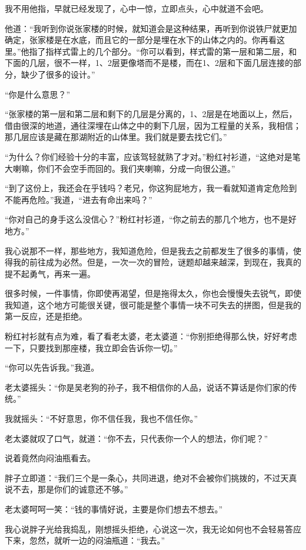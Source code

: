 我不用他指，早就已经发现了，心中一惊，立即点头，心中就道不会吧。

他道：“我听到你说张家楼的时候，就知道会是这种结果，再听到你说铁尸就更加确定，张家楼是在水底，而且它的一部分是埋在水下的山体之内的。你再看这里。”他指了指样式雷上的几个部分。“你可以看到，样式雷的第一层和第二层，和下面的几层，很不一样，1、2层更像塔而不是楼，而在1、2层和下面几层连接的部分，缺少了很多的设计。”

“你是什么意思？”

“张家楼的第一层和第二层和剩下的几层是分离的，1、2层是在地面以上，然后，借由很深的地道，通往深埋在山体之中的剩下几层，因为工程量的关系，我相信；那几层应该是藏在那湖附近的山体里。我们就是要去找它们。”

“为什么？你们经验十分的丰富，应该驾轻就熟了才对。”粉红衬衫道，“这绝对是笔大喇嘛，你们不会空手而回的。我们夹喇嘛，分成一向很公道。”

“到了这份上，我还会在乎钱吗？老兄，你这狗屁地方，我一看就知道肯定危险到不能再危险。”我道，“进去有命出来吗？”

“你对自己的身手这么没信心？”粉红衬衫道，“你之前去的那几个地方，也不是好地方。”

我心说那不一样，那些地方，我知道危险，但是我去之前都发生了很多的事情，使得我的前往成为必然。但是，一次一次的冒险，谜题却越来越深，到现在，我真的提不起勇气，再来一遍。

很多时候，一件事情，你即使再渴望，但是拖得太久，你也会慢慢失去锐气，即使我知道，这个地方可能很关键，很可能是整个事情一块不可失去的拼图，但是我的第一反应，还是拒绝。

粉红衬衫就有点为难，看了看老太婆，老太婆道：“你别拒绝得那么快，好好考虑一下，只要找到那座楼，我立即会告诉你一切。”

“你可以先告诉我。”我道。

老太婆摇头：“你是吴老狗的孙子，我不相信你的人品，说话不算话是你们家的传统。”

我就摇头：“不好意思，你不信任我，我也不信任你。”

老太婆就叹了口气，就道：“你不去，只代表你一个人的想法，你们呢？”

说着竟然向闷油瓶看去。

胖子立即道：“我们三个是一条心，共同进退，绝对不会被你们挑拨的，不过天真说不去，那是你们的诚意还不够。”

老太婆呵呵一笑：“钱的事情好说，主要是你们想去不想去。”

我心说胖子光给我捣乱，刚想摇头拒绝，心说这一次，我无论如何也不会轻易答应下来，忽然，就听一边的闷油瓶道：“我去。”

